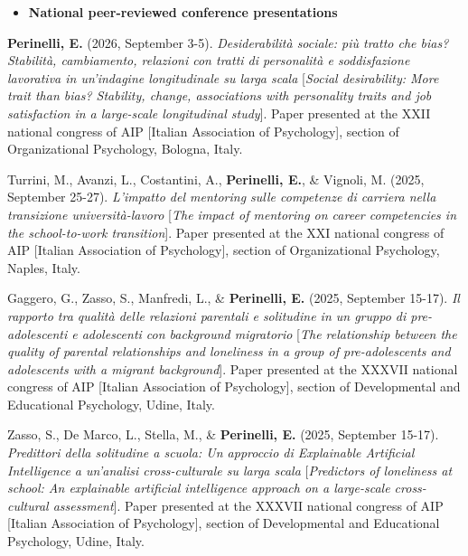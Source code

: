 \documentclass[hidelinks, letterpaper,10pt]{article} %
\begin{document}
\begin{itemize} 
	\setlength{\topsep}{0pt}%
	\setlength{\leftmargin}{0.1in}%
	\setlength{\listparindent}{-0.1in}%
	\setlength{\itemindent}{-0.2in}%
	\setlength{\parsep}{\parskip}%
	
	\item {\textbf{\large{National peer-reviewed conference presentations}}}
\end{itemize}
\begin{etaremune}
	
	\item \textbf{Perinelli, E.} (2026, September 3-5). \textit{Desiderabilità sociale: più tratto che bias? Stabilità, cambiamento, relazioni con tratti di personalità e soddisfazione lavorativa in un’indagine longitudinale su larga scala} [\textit{Social desirability: More trait than bias? Stability, change, associations with personality traits and job satisfaction in a large-scale longitudinal study}]. Paper presented at the XXII national congress of AIP [Italian Association of Psychology], section of Organizational Psychology, Bologna, Italy.

	\item Turrini, M., Avanzi, L., Costantini, A., \textbf{Perinelli, E.}, \& Vignoli, M. (2025, September 25-27). \textit{L’impatto del mentoring sulle competenze di carriera nella transizione università-lavoro} [\textit{The impact of mentoring on career competencies in the school-to-work transition}]. Paper presented at the XXI national congress of AIP [Italian Association of Psychology], section of Organizational Psychology, Naples, Italy.

	\item Gaggero, G., Zasso, S., Manfredi, L., \& \textbf{Perinelli, E.} (2025, September 15-17). \textit{Il rapporto tra qualità delle relazioni parentali e solitudine in un gruppo di pre-adolescenti e adolescenti con background migratorio} [\textit{The relationship between the quality of parental relationships and loneliness in a group of pre-adolescents and adolescents with a migrant background}]. Paper presented at the XXXVII national congress of AIP [Italian Association of Psychology], section of Developmental and Educational Psychology, Udine, Italy. 

	\item Zasso, S., De Marco, L., Stella, M., \& \textbf{Perinelli, E.} (2025, September 15-17). \textit{Predittori della solitudine a scuola: Un approccio di Explainable Artificial Intelligence a un’analisi cross-culturale su larga scala} [\textit{Predictors of loneliness at school: An explainable artificial intelligence approach on a large-scale cross-cultural assessment}]. Paper presented at the XXXVII national congress of AIP [Italian Association of Psychology], section of Developmental and Educational Psychology, Udine, Italy.


\end{etaremune}
\end{document}
